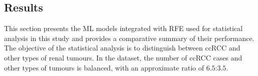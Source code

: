 



\subsection{Results}
\label{sec:analysis}

This section presents the ML models integrated with RFE used for statistical analysis in this study and provides a comparative summary of their performance. The objective of the statistical analysis is to distinguish between ccRCC and other types of renal tumours. In the dataset, the number of ccRCC cases and other types of tumours is balanced, with an approximate ratio of $6.5$:$3.5$.

